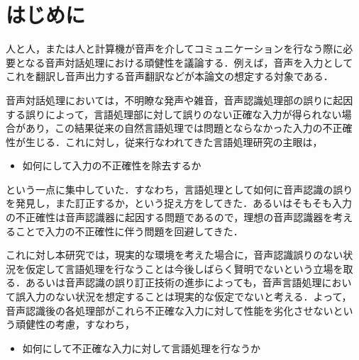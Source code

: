 
\maketitle
\thispagestyle{empty}

\newpage
\section{はじめに}

人と人，または人と計算機が音声を介してコミュニケーションを行なう際に必
要となる音声対話処理における頑健性を議論する．例えば，音声を入力として
これを翻訳し音声出力する音声翻訳などが本論文の想定する対象である．

音声対話処理においては，不明瞭な発声や雑音，音声認識処理部の誤りに起因
する誤りによって，言語処理部に対して誤りのない正確な入力が得られない場
合があり，この結果従来の自然言語処理では問題とならなかった入力の不正確
性が生じる．これに対し，従来行なわれてきた言語処理研究の主眼は，
\vspace*{\baselineskip}

\begin{itemize}
\item 如何にして入力の不正確性を除去するか
\end{itemize}
\vspace*{\baselineskip}

\noindent
という一点に集中していた．すなわち，言語処理として如何に音声認識の誤り
を発見し，また訂正するか，という捉え方をしてきた．あるいはそもそも入力
の不正確性は音声認識器に起因する問題であるので，理想の音声認識器を考え
ることで入力の不正確性に伴う問題を回避してきた．

これに対し本研究では，現実的な環境を考えた場合に，音声認識誤りのない状
況を仮定して言語処理を行なうことは今後しばらく賢明でないという立場を取
る．あるいは音声認識の誤り訂正技術の進歩によっても，音声言語処理におい
て誤入力のない状況を想定することは現実的な仮定でないと考える．よって，
音声認識後の各処理部がこれら不正確な入力に対して性能を劣化させないとい
う頑健性の考慮，すなわち，
\vspace*{\baselineskip}

\begin{itemize}
\item 如何にして不正確な入力に対して言語処理を行なうか
\end{itemize}
\vspace*{\baselineskip}

